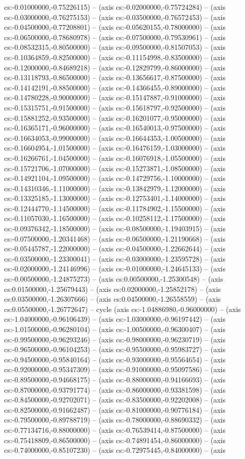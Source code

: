 cs:-0.01000000,-0.75226115) -- (axis cs:-0.02000000,-0.75724284) -- (axis cs:-0.03000000,-0.76275153) -- (axis cs:-0.03500000,-0.76572453) -- (axis cs:-0.04500000,-0.77208801) -- (axis cs:-0.05620155,-0.78000000) -- (axis cs:-0.06500000,-0.78680978) -- (axis cs:-0.07500000,-0.79530961) -- (axis cs:-0.08532315,-0.80500000) -- (axis cs:-0.09500000,-0.81507053) -- (axis cs:-0.10364859,-0.82500000) -- (axis cs:-0.11154998,-0.83500000) -- (axis cs:-0.12000000,-0.84689218) -- (axis cs:-0.12829799,-0.86000000) -- (axis cs:-0.13118793,-0.86500000) -- (axis cs:-0.13656617,-0.87500000) -- (axis cs:-0.14142191,-0.88500000) -- (axis cs:-0.14366455,-0.89000000) -- (axis cs:-0.14780228,-0.90000000) -- (axis cs:-0.15147887,-0.91000000) -- (axis cs:-0.15315751,-0.91500000) -- (axis cs:-0.15618797,-0.92500000) -- (axis cs:-0.15881252,-0.93500000) -- (axis cs:-0.16201077,-0.95000000) -- (axis cs:-0.16365171,-0.96000000) -- (axis cs:-0.16540013,-0.97500000) -- (axis cs:-0.16634053,-0.99000000) -- (axis cs:-0.16644353,-1.00500000) -- (axis cs:-0.16604954,-1.01500000) -- (axis cs:-0.16476159,-1.03000000) -- (axis cs:-0.16266761,-1.04500000) -- (axis cs:-0.16076918,-1.05500000) -- (axis cs:-0.15721706,-1.07000000) -- (axis cs:-0.15273871,-1.08500000) -- (axis cs:-0.14921104,-1.09500000) -- (axis cs:-0.14729756,-1.10000000) -- (axis cs:-0.14310346,-1.11000000) -- (axis cs:-0.13842979,-1.12000000) -- (axis cs:-0.13325185,-1.13000000) -- (axis cs:-0.12753401,-1.14000000) -- (axis cs:-0.12444770,-1.14500000) -- (axis cs:-0.11784902,-1.15500000) -- (axis cs:-0.11057030,-1.16500000) -- (axis cs:-0.10258112,-1.17500000) -- (axis cs:-0.09376342,-1.18500000) -- (axis cs:-0.08500000,-1.19403915) -- (axis cs:-0.07500000,-1.20341468) -- (axis cs:-0.06500000,-1.21190668) -- (axis cs:-0.05445787,-1.22000000) -- (axis cs:-0.04500000,-1.22662644) -- (axis cs:-0.03500000,-1.23300041) -- (axis cs:-0.03000000,-1.23595728) -- (axis cs:-0.02000000,-1.24146996) -- (axis cs:-0.01000000,-1.24645133) -- (axis cs:-0.00500000,-1.24875273) -- (axis cs:0.00500000,-1.25300548) -- (axis cs:0.01500000,-1.25679443) -- (axis cs:0.02000000,-1.25852178) -- (axis cs:0.03500000,-1.26307666) -- (axis cs:0.04500000,-1.26558559) -- (axis cs:0.05500000,-1.26772647) -- cycle (axis cs:-1.04886980,-0.96000000) -- (axis cs:-1.04000000,-0.96106439) -- (axis cs:-1.03000000,-0.96197442) -- (axis cs:-1.01500000,-0.96280104) -- (axis cs:-1.00500000,-0.96300407) -- (axis cs:-0.99500000,-0.96293246) -- (axis cs:-0.98000000,-0.96230719) -- (axis cs:-0.96500000,-0.96104253) -- (axis cs:-0.95500000,-0.95983727) -- (axis cs:-0.94500000,-0.95840164) -- (axis cs:-0.93000000,-0.95564654) -- (axis cs:-0.92000000,-0.95347309) -- (axis cs:-0.91000000,-0.95097586) -- (axis cs:-0.89500000,-0.94668175) -- (axis cs:-0.88000000,-0.94166693) -- (axis cs:-0.87000000,-0.93791774) -- (axis cs:-0.86000000,-0.93381598) -- (axis cs:-0.84500000,-0.92702071) -- (axis cs:-0.83500000,-0.92202008) -- (axis cs:-0.82500000,-0.91662487) -- (axis cs:-0.81000000,-0.90776184) -- (axis cs:-0.79500000,-0.89788719) -- (axis cs:-0.78000000,-0.88690332) -- (axis cs:-0.77134716,-0.88000000) -- (axis cs:-0.76539414,-0.87500000) -- (axis cs:-0.75418809,-0.86500000) -- (axis cs:-0.74891454,-0.86000000) -- (axis cs:-0.74000000,-0.85107230) -- (axis cs:-0.72975445,-0.84000000) -- (axis 